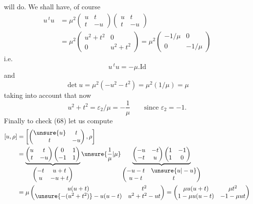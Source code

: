 will do. We shall have, of course
\[
\begin{aligned}
u\,{}^tu
&=\mu^2\begin{pmatrix}u&t\\t&-u\end{pmatrix}
\begin{pmatrix}u&t\\t&-u\end{pmatrix}\\
&=\mu^2\begin{pmatrix}u^2+t^2&0\\0&u^2+t^2\end{pmatrix}
=\mu^2\begin{pmatrix}-1/\mu&0\\0&-1/\mu\end{pmatrix}
\end{aligned}
\]
i.e.
\[
u\,{}^tu=-\mu.\mathrm{Id}
\]
and
\[
\det u=\mu^2(-u^2-t^2)=\mu^2(1/\mu)=\mu
\]
taking into account that now
\[
u^2+t^2=\varepsilon_2/\mu=-\frac1\mu
\qquad\text{since }\varepsilon_2=-1.
\]
Finally to check (68) let us compute
\[
\begin{aligned}
[u,\rho]
&=\left[\begin{pmatrix}\unsure{u}&t\\t&-u\end{pmatrix},\rho\right]\\
&=\underbrace{
\begin{pmatrix}u&t\\t&-u\end{pmatrix}
\begin{pmatrix}0&1\\-1&1\end{pmatrix}
}_{\begin{pmatrix}-t&u+t\\u&-u+t\end{pmatrix}}
\unsure{\dfrac1\mu|\mu}
\underbrace{
\begin{pmatrix}-u&-t\\-t&u\end{pmatrix}
\begin{pmatrix}1&-1\\1&0\end{pmatrix}
}_{\begin{pmatrix}-u-t&\unsure{u|-u}\\u-t&t\end{pmatrix}}
\\
&=\mu\begin{pmatrix}
u(u+t)&t^2\\
\unsure{-(u^2+t^2)}-u(u-t)&u^2+t^2-ut
\end{pmatrix}
=\begin{pmatrix}
\mu u(u+t)&\mu t^2\\
1-\mu u(u-t)&-1-\mu ut
\end{pmatrix}
\end{aligned}
\]
